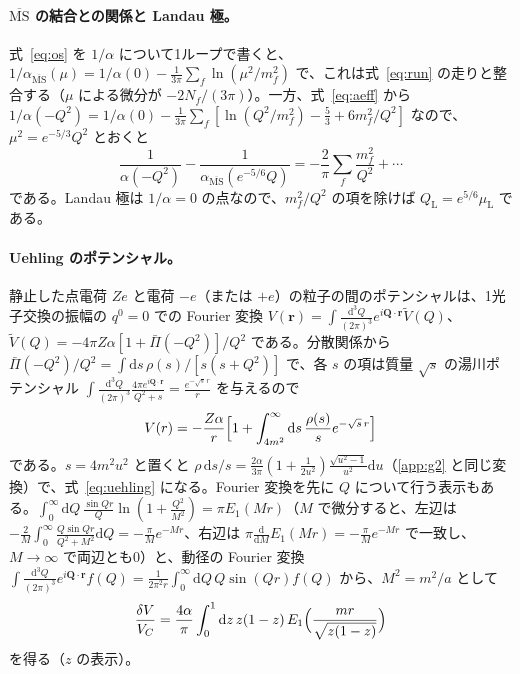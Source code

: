\documentclass[a4paper,10pt]{ltjsarticle}
\newcommand{\dd}{\mathrm{d}}
\newcommand{\MSbar}{\overline{\mathrm{MS}}}
\begin{document}
\paragraph{$\MSbar$ の結合との関係と Landau 極。}式~\eqref{eq:os} を $1/\alpha$ について1ループで書くと、$1/\alpha_{\MSbar}(\mu)=1/\alpha(0)-\frac1{3\pi}\sum_f\ln(\mu^2/m_f^2)$ で、これは式~\eqref{eq:run} の走りと整合する（$\mu$ による微分が $-2N_f/(3\pi)$）。一方、式~\eqref{eq:aeff} から $1/\alpha(-Q^2)=1/\alpha(0)-\frac1{3\pi}\sum_f[\ln(Q^2/m_f^2)-\frac53+6m_f^2/Q^2]$ なので、$\mu^2=e^{-5/3}Q^2$ とおくと
\begin{equation*}
\frac{1}{\alpha(-Q^2)}-\frac{1}{\alpha_{\MSbar}(e^{-5/6}Q)}=-\frac{2}{\pi}\sum_f\frac{m_f^2}{Q^2}+\cdots
\end{equation*}
である。Landau 極は $1/\alpha=0$ の点なので、$m_f^2/Q^2$ の項を除けば $Q_{\mathrm L}=e^{5/6}\mu_{\mathrm L}$ である。

\paragraph{Uehling のポテンシャル。}静止した点電荷 $Ze$ と電荷 $-e$（または $+e$）の粒子の間のポテンシャルは、1光子交換の振幅の $q^0=0$ での Fourier 変換 $V(\boldsymbol r)=\int\frac{\dd^3Q}{(2\pi)^3}e^{i\boldsymbol Q\cdot\boldsymbol r}\tilde V(Q)$、$\tilde V(Q)=-4\pi Z\alpha[1+\bar\Pi(-Q^2)]/Q^2$ である。分散関係から $\bar\Pi(-Q^2)/Q^2=\int\dd s\,\rho(s)/[s(s+Q^2)]$ で、各 $s$ の項は質量 $\sqrt s$ の湯川ポテンシャル $\int\frac{\dd^3Q}{(2\pi)^3}\frac{4\pi e^{i\boldsymbol Q\cdot\boldsymbol r}}{Q^2+s}=\frac{e^{-\sqrt s\,r}}{r}$ を与えるので
\begin{equation*}
V(r)=-\frac{Z\alpha}{r}\Bigl[1+\int_{4m^2}^\infty\dd s\,\frac{\rho(s)}{s}e^{-\sqrt s\,r}\Bigr]
\end{equation*}
である。$s=4m^2u^2$ と置くと $\rho\,\dd s/s=\frac{2\alpha}{3\pi}(1+\frac1{2u^2})\frac{\sqrt{u^2-1}}{u^2}\dd u$（\ref{app:g2} と同じ変換）で、式~\eqref{eq:uehling} になる。Fourier 変換を先に $Q$ について行う表示もある。$\int_0^\infty\dd Q\,\frac{\sin Qr}{Q}\ln(1+\frac{Q^2}{M^2})=\pi E_1(Mr)$（$M$ で微分すると、左辺は $-\frac2M\int_0^\infty\frac{Q\sin Qr}{Q^2+M^2}\dd Q=-\frac\pi Me^{-Mr}$、右辺は $\pi\frac{\dd}{\dd M}E_1(Mr)=-\frac\pi Me^{-Mr}$ で一致し、$M\to\infty$ で両辺とも0）と、動径の Fourier 変換 $\int\frac{\dd^3Q}{(2\pi)^3}e^{i\boldsymbol Q\cdot\boldsymbol r}f(Q)=\frac{1}{2\pi^2r}\int_0^\infty\dd Q\,Q\sin(Qr)f(Q)$ から、$M^2=m^2/a$ として
\begin{equation*}
\frac{\delta V}{V_C}=\frac{4\alpha}{\pi}\int_0^1\dd z\,z(1-z)\,E_1\Bigl(\frac{mr}{\sqrt{z(1-z)}}\Bigr)
\end{equation*}
を得る（$z$ の表示）。
\end{document}

